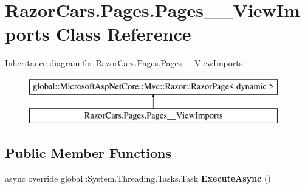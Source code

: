 \hypertarget{class_razor_cars_1_1_pages_1_1_pages_____view_imports}{}\section{Razor\+Cars.\+Pages.\+Pages\+\_\+\+\_\+\+View\+Imports Class Reference}
\label{class_razor_cars_1_1_pages_1_1_pages_____view_imports}
Inheritance diagram for Razor\+Cars.\+Pages.\+Pages\+\_\+\+\_\+\+View\+Imports\+:\begin{figure}[H]
\begin{center}
\leavevmode
\includegraphics[height=2.000000cm]{class_razor_cars_1_1_pages_1_1_pages_____view_imports}
\end{center}
\end{figure}
\subsection*{Public Member Functions}
\begin{DoxyCompactItemize}
\item 
\mbox{\label{class_razor_cars_1_1_pages_1_1_pages_____view_imports_af89dc19584103e52d2e28d17b95ccf39}} 
async override global\+::\+System.\+Threading.\+Tasks.\+Task {\bfseries Execute\+Async} ()
\end{DoxyCompactItemize}
